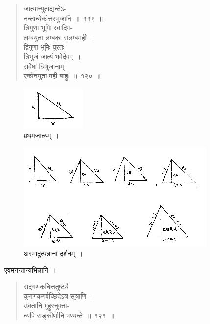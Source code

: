 \documentclass[11pt, openany]{book}
\begin{document}
\begin{quote}
    \bs 
जात्यान्युत्पद्यन्तेऽ- \\
नन्तान्येकोत्तरभुजानि~॥~११९~॥~\\
त्रिगुणा भूमिः स्वादिम-\\
लम्बयुता लम्बकः सलम्बमही~। \\
द्विगुणा भूमिः पुरतः\\
त्रिभुजं जात्यं भवेदेवम्~। \\
सर्वेषां त्रिभुजानाम्\\
एकोनयुता मही बाहुः~॥~१२०~॥~
\end{quote}
\begin{figure}[h!]
         \centering
         \captionsetup{labelformat=empty}
          \caption{प्रथमजात्यम्~।}
\vspace{-2mm}
         \includegraphics[scale=0.85]{graphics/capture149.png}
     \end{figure}
\newpage%
\begin{figure}[h!]
         \centering
         \captionsetup{labelformat=empty}
          \caption{अस्मादुत्पन्नानां दर्शनम्~।}
\vspace{-2mm}
         \includegraphics[scale=0.85]{graphics/capture150.png}
     \end{figure}
     
 एवमनन्तान्यभिन्नानि~। 
\vspace{2mm}

\begin{quote}
    \bs 
    सद्गणकचित्ततुष्ट्यै \\
कुगणकगर्वच्छिदेऽत्र सूत्राणि~। \\
उक्तानि मुहुरनुक्ता-\\
न्यपि सङ्कीर्णानि भण्यन्ते~॥~१२१~॥~
\end{quote}
\vspace{2mm}
\end{document}
